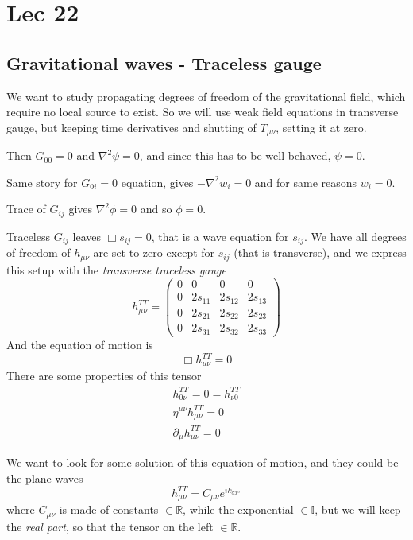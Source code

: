 \section{Lec 22}
\subsection{Gravitational waves - Traceless gauge}
We want to study propagating degrees of freedom of the gravitational field, which require no local source to exist. So we will use weak field equations in transverse gauge, but keeping time derivatives and shutting of $T_{\mu \nu }$, setting it at zero.\par
Then $G_{00} = 0 $ and $\nabla^{2}\psi  = 0$, and since this has to be well behaved, $\psi =0$.\par

Same story for $G_{0i} = 0 $ equation, gives $-\nabla ^{2}w_{i} =0$ and for same reasons $w_{i} = 0$.\par
Trace of $G_{ij} $ gives $\nabla ^{2}\phi =0$ and so $\phi =0$.\par
Traceless $G_{ij}$ leaves $\Box s_{ij} = 0$, that is a wave equation for $s_{ij}$. We have all degrees of freedom of $h_{\mu \nu }$ are set to zero except for $s_{ij}$ (that is transverse), and we express this setup with the \emph{transverse traceless gauge}
\[
h_{\mu \nu }^{TT} = \begin{pmatrix}
0 & 0 & 0 & 0 \\
0 & 2s_{11} & 2s_{12} & 2s_{13} \\
0 & 2s_{21} & 2s_{22} & 2s_{23} \\
0 & 2s_{31} & 2s_{32} & 2s_{33}
\end{pmatrix} 
\]
And the equation of motion is 
\[
\Box h_{\mu \nu }^{TT} =0
\]
There are some properties of this tensor
\begin{align}
h_{0 \nu }^{TT} = 0 =  h^{TT}_{\nu 0} \\
\eta ^{\mu \nu } h^{TT}_{\mu \nu } =0\\
\partial_{\mu }h^{TT}_{\mu \nu } = 0
\end{align}

We want to look for some solution of this equation of motion, and they could be the plane waves
\[
h^{TT}_{\mu \nu } = C_{\mu \nu }e^{ik_{\sigma x^{\sigma }}}
\]
where $C_{\mu \nu }$ is made of constants $\in \mathbb{R}$, while the exponential $\in \mathbb{I}$, but we will keep the \emph{real part}, so that the tensor on the left $\in \mathbb{R}$.\par

